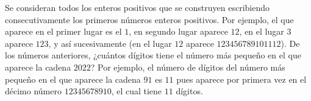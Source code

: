Se consideran todos los enteros positivos que se construyen escribiendo consecutivamente los primeros números enteros positivos. Por ejemplo, el que aparece en el primer lugar es el $1$, en segundo lugar aparece $12$, en el lugar $3$ aparece $123$, y así sucesivamente (en el lugar $12$ aparece $123456789101112$). De los números anteriores, ¿cuántos dígitos tiene el número más pequeño en el que aparece la cadena $2022$? Por ejemplo, el número de dígitos del número más pequeño en el que aparece la cadena $91$ es $11$ pues aparece por primera vez en el décimo número $12345678910$, el cual tiene $11$ dígitos.